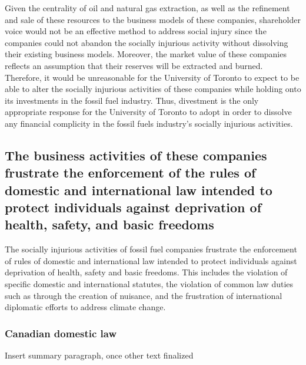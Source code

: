 Given the centrality of oil and natural gas extraction, as well as the refinement and sale of these resources to the business models of these companies, shareholder voice would not be an effective method to address social injury since the companies could not abandon the socially injurious activity without dissolving their existing business models.  
Moreover, the market value of these companies reflects an assumption that their reserves will be extracted and burned.  
Therefore, it would be unreasonable for the University of Toronto to expect to be able to alter the socially injurious activities of these companies while holding onto its investments in the fossil fuel industry.  
Thus, divestment is the only appropriate response for the University of Toronto to adopt in order to dissolve any financial complicity in the fossil fuels industry’s socially injurious activities.  



	\subsection{The business activities of these companies frustrate the enforcement of the rules of domestic and international law intended to protect individuals against deprivation of health, safety, and basic freedoms}
	\label{sec:FrustrateLaw}



The socially injurious activities of fossil fuel companies frustrate the enforcement of rules of domestic and international law intended to protect individuals against deprivation of health, safety and basic freedoms.  
This includes the violation of specific domestic and international statutes, the violation of common law duties such as through the creation of nuisance, and the frustration of international diplomatic efforts to address climate change.



	\subsubsection{Canadian domestic law}


\begin{vcom}
Insert summary paragraph, once other text finalized
\end{vcom}




